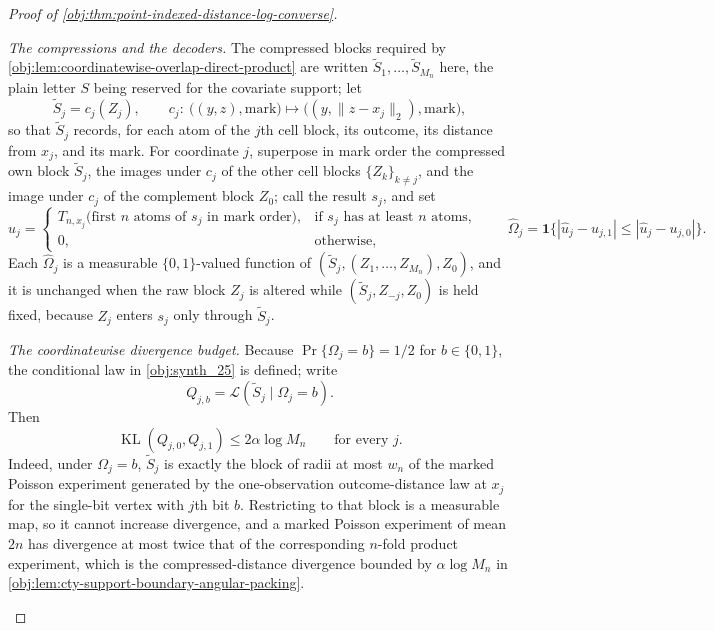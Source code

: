 \begin{proof}[Proof of \cref{obj:thm:point-indexed-distance-log-converse}]
\begin{enumerate}
\emph{The compressions and the decoders.}  The compressed blocks required by \cref{obj:lem:coordinatewise-overlap-direct-product} are written \(\widetilde S_1,\ldots,\widetilde S_{M_n}\) here, the plain letter \(S\) being reserved for the covariate support; let
\[
\widetilde S_j=c_j(Z_j),
\qquad
c_j:\ \bigl((y,z),\text{mark}\bigr)\longmapsto\bigl((y,\lVert z-x_j\rVert_2),\text{mark}\bigr),
\]
so that \(\widetilde S_j\) records, for each atom of the \(j\)th cell block, its outcome, its distance from \(x_j\), and its mark.
For coordinate \(j\), superpose in mark order the compressed own block \(\widetilde S_j\), the images under \(c_j\) of the other cell blocks \(\{Z_k\}_{k\neq j}\), and the image under \(c_j\) of the complement block \(Z_0\); call the result \(s_j\), and set
\[
\widehat u_j
=
\begin{cases}
T_{n,x_j}\bigl(\text{first \(n\) atoms of }s_j\text{ in mark order}\bigr), & \text{if }s_j\text{ has at least \(n\) atoms},\\
0,&\text{otherwise,}
\end{cases}
\qquad
\widehat\Omega_j=\mathbf 1\bigl\{|\widehat u_j-u_{j,1}|\le|\widehat u_j-u_{j,0}|\bigr\}.
\]
Each \(\widehat\Omega_j\) is a measurable \(\{0,1\}\)-valued function of \((\widetilde S_j,(Z_1,\ldots,Z_{M_n}),Z_0)\), and it is unchanged when the raw block \(Z_j\) is altered while \((\widetilde S_j,Z_{-j},Z_0)\) is held fixed, because \(Z_j\) enters \(s_j\) only through \(\widetilde S_j\).

\emph{The coordinatewise divergence budget.}  Because \(\Pr\{\Omega_j=b\}=1/2\) for \(b\in\{0,1\}\), the conditional law in \cref{obj:synth_25} is defined; write
\[
Q_{j,b}=\mathcal L(\widetilde S_j\mid\Omega_j=b).
\]
Then
\[
\operatorname{KL}(Q_{j,0},Q_{j,1})\le 2\alpha\log M_n
\qquad\text{for every }j .
\]
Indeed, under \(\Omega_j=b\), \(\widetilde S_j\) is exactly the block of radii at most \(w_n\) of the marked Poisson experiment generated by the one-observation outcome-distance law at \(x_j\) for the single-bit vertex with \(j\)th bit \(b\).  Restricting to that block is a measurable map, so it cannot increase divergence, and a marked Poisson experiment of mean \(2n\) has divergence at most twice that of the corresponding \(n\)-fold product experiment, which is the compressed-distance divergence bounded by \(\alpha\log M_n\) in \cref{obj:lem:cty-support-boundary-angular-packing}.


\end{enumerate}
\end{proof}
